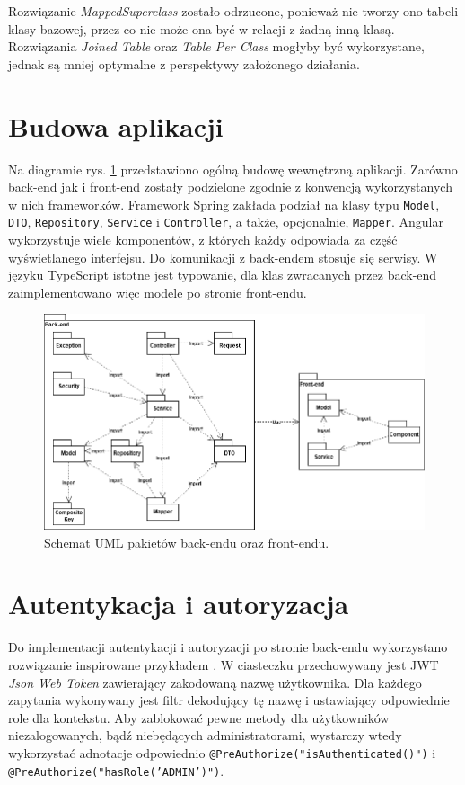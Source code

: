 \documentclass[a4paper,twoside,12pt]{book}
\newcommand{\obcy}[1]{\emph{#1}}
\newcommand{\english}[1]{{\selectlanguage{british}\obcy{#1}}}
\begin{document}
Rozwiązanie \english{MappedSuperclass} zostało odrzucone, ponieważ nie tworzy ono tabeli klasy bazowej, przez co nie może ona być w relacji z żadną inną klasą. Rozwiązania \english{Joined Table} oraz \english{Table Per Class} mogłyby być wykorzystane, jednak są mniej optymalne z perspektywy założonego działania.

\section{Budowa aplikacji}

Na diagramie rys. \ref{fig:package} przedstawiono ogólną budowę wewnętrzną aplikacji. Zarówno back-end jak i front-end zostały podzielone zgodnie z konwencją wykorzystanych w nich frameworków. Framework Spring zakłada podział na klasy typu \texttt{Model}, \texttt{DTO}, \texttt{Repository}, \texttt{Service} i \texttt{Controller}, a także, opcjonalnie, \texttt{Mapper}. Angular wykorzystuje wiele komponentów, z których każdy odpowiada za część wyświetlanego interfejsu. Do komunikacji z back-endem stosuje się serwisy. W języku TypeScript istotne jest typowanie, dla klas zwracanych przez back-end zaimplementowano więc modele po stronie front-endu.

\begin{figure}
\centering
\includegraphics[width=\textwidth]{./UML-Package.png}
\caption{Schemat UML pakietów back-endu oraz front-endu.}
\label{fig:package}
\end{figure}

\section{Autentykacja i autoryzacja}

Do implementacji autentykacji i autoryzacji po stronie back-endu wykorzystano rozwiązanie inspirowane przykładem \cite{bib:bkspringauth}. W ciasteczku przechowywany jest JWT \english{Json Web Token} zawierający zakodowaną nazwę użytkownika. Dla każdego zapytania wykonywany jest filtr dekodujący tę nazwę i ustawiający odpowiednie role dla kontekstu. Aby zablokować pewne metody dla użytkowników niezalogowanych, bądź niebędących administratorami, wystarczy wtedy wykorzystać adnotacje odpowiednio \texttt{@PreAuthorize("isAuthenticated()")} i \texttt{@PreAuthorize("hasRole('ADMIN')")}. 
\end{document}
